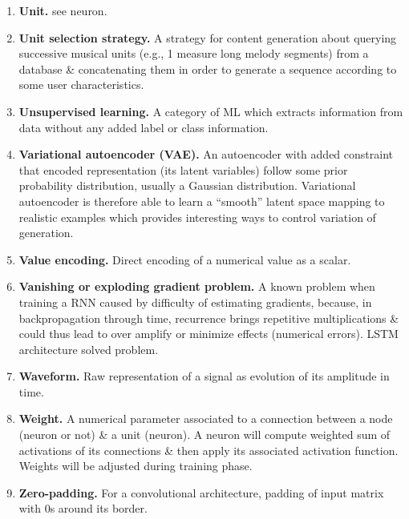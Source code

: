 \documentclass{article}
\begin{document}
\begin{itemize}
\begin{enumerate}
		\item {\bf Unit.} see neuron.
		\item {\bf Unit selection strategy.} A strategy for content generation about querying successive musical units (e.g., 1 measure long melody segments) from a database \& concatenating them in order to generate a sequence according to some user characteristics.
		\item {\bf Unsupervised learning.} A category of ML which extracts information from data without any added label or class information.
		\item {\bf Variational autoencoder (VAE).} An autoencoder with added constraint that encoded representation (its latent variables) follow some prior probability distribution, usually a Gaussian distribution. Variational autoencoder is therefore able to learn a ``smooth'' latent space mapping to realistic examples which provides interesting ways to control variation of generation.
		\item {\bf Value encoding.} Direct encoding of a numerical value as a scalar.
		\item {\bf Vanishing or exploding gradient problem.} A known problem when training a RNN caused by difficulty of estimating gradients, because, in backpropagation through time, recurrence brings repetitive multiplications \& could thus lead to over amplify or minimize effects (numerical errors). LSTM architecture solved problem.
		\item {\bf Waveform.} Raw representation of a signal as evolution of its amplitude in time.
		\item {\bf Weight.} A numerical parameter associated to a connection between a node (neuron or not) \& a unit (neuron). A neuron will compute weighted sum of activations of its connections \& then apply its associated activation function. Weights will be adjusted during training phase.
		\item {\bf Zero-padding.} For a convolutional architecture, padding of input matrix with 0s around its border.
	\end{enumerate}
\end{itemize}

\end{document}
